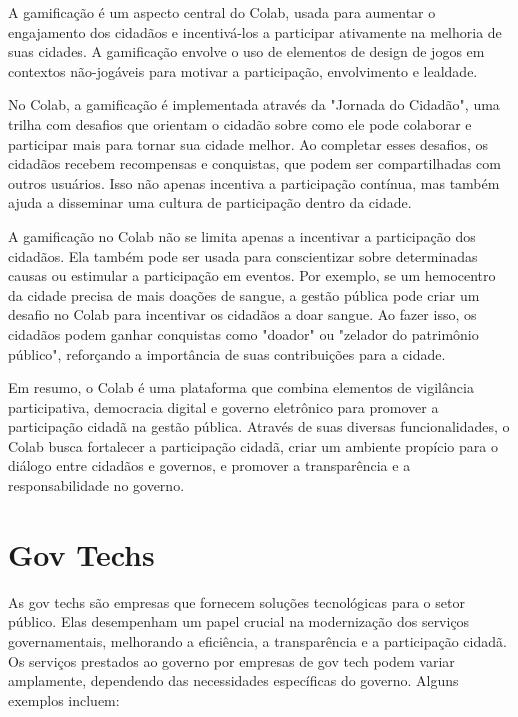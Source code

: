 A gamificação é um aspecto central do Colab, usada para aumentar o engajamento dos cidadãos e incentivá-los a participar ativamente na melhoria de suas cidades. A gamificação envolve o uso de elementos de design de jogos em contextos não-jogáveis para motivar a participação, envolvimento e lealdade.

No Colab, a gamificação é implementada através da "Jornada do Cidadão", uma trilha com desafios que orientam o cidadão sobre como ele pode colaborar e participar mais para tornar sua cidade melhor. Ao completar esses desafios, os cidadãos recebem recompensas e conquistas, que podem ser compartilhadas com outros usuários. Isso não apenas incentiva a participação contínua, mas também ajuda a disseminar uma cultura de participação dentro da cidade.

A gamificação no Colab não se limita apenas a incentivar a participação dos cidadãos. Ela também pode ser usada para conscientizar sobre determinadas causas ou estimular a participação em eventos. Por exemplo, se um hemocentro da cidade precisa de mais doações de sangue, a gestão pública pode criar um desafio no Colab para incentivar os cidadãos a doar sangue. Ao fazer isso, os cidadãos podem ganhar conquistas como "doador" ou "zelador do patrimônio público", reforçando a importância de suas contribuições para a cidade.

Em resumo, o Colab é uma plataforma que combina elementos de vigilância participativa, democracia digital e governo eletrônico para promover a participação cidadã na gestão pública. Através de suas diversas funcionalidades, o Colab busca fortalecer a participação cidadã, criar um ambiente propício para o diálogo entre cidadãos e governos, e promover a transparência e a responsabilidade no governo.

\section*{Gov Techs}
As gov techs são empresas que fornecem soluções tecnológicas para o setor público. Elas desempenham um papel crucial na modernização dos serviços governamentais, melhorando a eficiência, a transparência e a participação cidadã. Os serviços prestados ao governo por empresas de gov tech podem variar amplamente, dependendo das necessidades específicas do governo. Alguns exemplos incluem:

